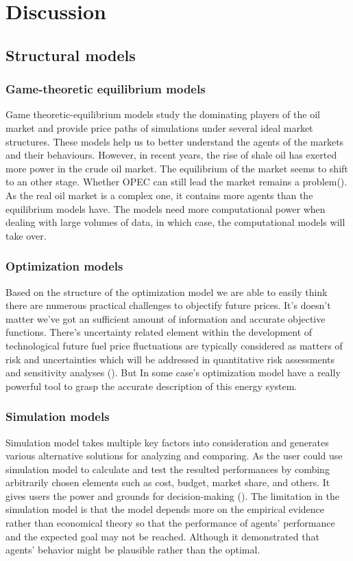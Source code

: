\chapter{Discussion}

\section{Structural models}

\subsection{Game-theoretic equilibrium models}
Game theoretic-equilibrium models study the dominating players of the oil market and provide price paths of simulations under several ideal market structures. These models help us to better understand the agents of the markets and their behaviours. However, in recent years, the rise of shale oil has exerted more power in the crude oil market. The equilibrium of the market seems to shift to an other stage. Whether OPEC can still lead the market remains a problem(\cite{ansari2017opec}). As the real oil market is a complex one, it contains more agents than the equilibrium models have.  The models need more computational power when dealing with large volumes of data, in which case, the computational models will take over.

\subsection{Optimization models}
Based on the structure of the optimization model we are able to easily think there are numerous practical challenges to objectify future prices. It's doesn't matter we've got an sufficient amount of information and accurate objective functions. There's uncertainty related element within the development of technological future fuel price fluctuations are typically considered as matters of risk and uncertainties which will be addressed in quantitative risk assessments and sensitivity analyses (\cite{lund2017simulation}). But In some case's optimization model have a really powerful tool to grasp the accurate description of this energy system.

\subsection{Simulation models}
Simulation model takes multiple key factors into consideration and generates various alternative solutions for analyzing and comparing. As the user could use simulation model to calculate and test the resulted performances by combing arbitrarily chosen elements such as cost, budget, market share, and others. It gives users the power and grounds for decision-making (\cite{lund2017simulation}). The limitation in the simulation model is that the model depends more on the empirical evidence rather than economical theory so that the performance of agents' performance and the expected goal may not be reached. Although it demonstrated that agents' behavior might be plausible rather than the optimal.


